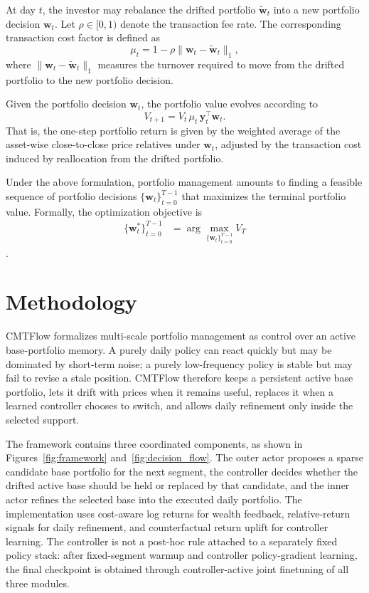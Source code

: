 \documentclass[letterpaper]{article} %
\begin{document}
At day $t$, the investor may rebalance the drifted portfolio $\tilde{\mathbf{w}}_t$ into a new portfolio decision $\mathbf{w}_t$. Let $\rho\in[0,1)$ denote the transaction fee rate. The corresponding transaction cost factor is defined as
\[
\mu_t
=
1-\rho\|\mathbf{w}_t-\tilde{\mathbf{w}}_t\|_1,
\]
where $\|\mathbf{w}_t-\tilde{\mathbf{w}}_t\|_1$ measures the turnover required to move from the drifted portfolio to the new portfolio decision.

Given the portfolio decision $\mathbf{w}_t$, the portfolio value evolves according to
\[
V_{t+1} = V_t\,\mu_t\, \mathbf{y}_t^\top \mathbf{w}_t.
\]
That is, the one-step portfolio return is given by the weighted average of the asset-wise close-to-close price relatives under $\mathbf{w}_t$, adjusted by the transaction cost induced by reallocation from the drifted portfolio.

Under the above formulation, portfolio management amounts to finding a feasible sequence of portfolio decisions $\{\mathbf{w}_t\}_{t=0}^{T-1}$ that maximizes the terminal portfolio value. Formally, the optimization objective is
\[
\begin{aligned}
\{\mathbf{w}_t^*\}_{t=0}^{T-1}
&= \arg\max_{\{\mathbf{w}_t\}_{t=0}^{T-1}} V_T
\end{aligned}
\].

\section{Methodology}
CMTFlow formalizes multi-scale portfolio management as control over an active base-portfolio memory. A purely daily policy can react quickly but may be dominated by short-term noise; a purely low-frequency policy is stable but may fail to revise a stale position. CMTFlow therefore keeps a persistent active base portfolio, lets it drift with prices when it remains useful, replaces it when a learned controller chooses to switch, and allows daily refinement only inside the selected support.

The framework contains three coordinated components, as shown in Figures~\ref{fig:framework} and~\ref{fig:decision_flow}. The outer actor proposes a sparse candidate base portfolio for the next segment, the controller decides whether the drifted active base should be held or replaced by that candidate, and the inner actor refines the selected base into the executed daily portfolio. The implementation uses cost-aware log returns for wealth feedback, relative-return signals for daily refinement, and counterfactual return uplift for controller learning. The controller is not a post-hoc rule attached to a separately fixed policy stack: after fixed-segment warmup and controller policy-gradient learning, the final checkpoint is obtained through controller-active joint finetuning of all three modules.
\end{document}
